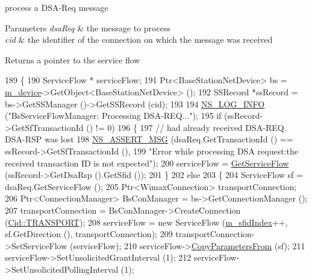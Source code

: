 process a D\+S\+A-\/\+Req message 


\begin{DoxyParams}{Parameters}
{\em dsa\+Req} & the message to process \\
\hline
{\em cid} & the identifier of the connection on which the message was received \\
\hline
\end{DoxyParams}
\begin{DoxyReturn}{Returns}
a pointer to the service flow 
\end{DoxyReturn}

\begin{DoxyCode}
189 \{
190   ServiceFlow * serviceFlow;
191   Ptr<BaseStationNetDevice> bs = \hyperlink{classns3_1_1BsServiceFlowManager_a6fa275f84e4458c687787b1974a00382}{m\_device}->GetObject<BaseStationNetDevice> ();
192   SSRecord *ssRecord = bs->GetSSManager ()->GetSSRecord (cid);
193 
194   \hyperlink{group__logging_gafbd73ee2cf9f26b319f49086d8e860fb}{NS\_LOG\_INFO} (\textcolor{stringliteral}{"BsServiceFlowManager: Processing DSA-REQ..."});
195   \textcolor{keywordflow}{if} (ssRecord->GetSfTransactionId () != 0)
196     \{
197       \textcolor{comment}{// had already received DSA-REQ. DSA-RSP was lost}
198       \hyperlink{assert_8h_aff5ece9066c74e681e74999856f08539}{NS\_ASSERT\_MSG} (dsaReq.GetTransactionId () == ssRecord->GetSfTransactionId (),
199                      \textcolor{stringliteral}{"Error while processing DSA request:the received transaction ID is not expected"});
200       serviceFlow = \hyperlink{classns3_1_1BsServiceFlowManager_ad810acaf5c36eafeb62085667d1fac31}{GetServiceFlow} (ssRecord->GetDsaRsp ().GetSfid ());
201     \}
202   \textcolor{keywordflow}{else}
203     \{
204       ServiceFlow sf = dsaReq.GetServiceFlow ();
205       Ptr<WimaxConnection> transportConnection;
206       Ptr<ConnectionManager> BsConManager = bs->GetConnectionManager ();
207       transportConnection = BsConManager->CreateConnection (\hyperlink{classns3_1_1Cid_a10b8f92080ca5790e65a0bfa2f557e0aa46fbed56841c3bf471aa84de022edf87}{Cid::TRANSPORT});
208       serviceFlow = \textcolor{keyword}{new} ServiceFlow (\hyperlink{classns3_1_1BsServiceFlowManager_af08f7e386d477d94d6ed94f39c692c4f}{m\_sfidIndex}++, sf.GetDirection (), transportConnection);
209       transportConnection->SetServiceFlow (serviceFlow);
210       serviceFlow->\hyperlink{classns3_1_1ServiceFlow_aae60e9fc7ea6b727946980e1ad376da7}{CopyParametersFrom} (sf);
211       serviceFlow->SetUnsolicitedGrantInterval (1);
212       serviceFlow->SetUnsolicitedPollingInterval (1);

\end{DoxyCode}
